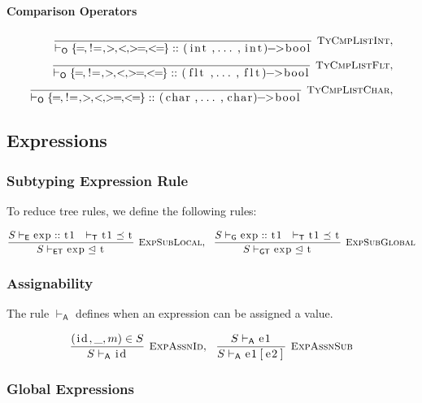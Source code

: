 \documentclass{article}
\newcommand{\code}[1]{\lstinline[columns=fixed]{#1}}
\newcommand{\drmrule}[5]{\frac{#1}{#2\vdash_{\mathsf{#3}}#4}\textsc{\ \small{#5}}}
\newcommand{\ruleapp}[1]{\vdash_{\mathsf{#1}}}
\newcommand{\mc}[1]{\textnormal{\code{#1}}}
\newcommand{\subsubsubsection}{\paragraph}
\begin{document}
				\subsubsubsection{Comparison Operators}
				
					\begin{align*}
						\drmrule{}{}{O}{\{\mc{=},\mc{!=},\mc{>},\mc{<},\mc{>=},\mc{<=}\} :: \mc{(int,...,int)->bool}}{TyCmpListInt},\\
						\drmrule{}{}{O}{\{\mc{=},\mc{!=},\mc{>},\mc{<},\mc{>=},\mc{<=}\} :: \mc{(flt,...,flt)->bool}}{TyCmpListFlt},\\
						\drmrule{}{}{O}{\{\mc{=},\mc{!=},\mc{>},\mc{<},\mc{>=},\mc{<=}\} :: \mc{(char,...,char)->bool}}{TyCmpListChar},\\
					\end{align*}
					
					
		\subsection{Expressions}
		
			\subsubsection{Subtyping Expression Rule}
			
				To reduce tree rules, we define the following rules:
				
				\begin{align*}
					\drmrule{S\ruleapp{E}\mc{exp}::\mc{t1}\ \ \ruleapp{T}\mc{t1}\preceq\mc{t}}{S}{ET}{\mc{exp} \trianglelefteq \mc{t}}{ExpSubLocal},\ \ 
					\drmrule{S\ruleapp{G}\mc{exp}::\mc{t1}\ \ \ruleapp{T}\mc{t1}\preceq\mc{t}}{S}{GT}{\mc{exp} \trianglelefteq \mc{t}}{ExpSubGlobal}
				\end{align*}
		
			\subsubsection{Assignability}
			
				The rule $\ruleapp{A}$ defines when an expression can be assigned a value.
				
				\begin{align*}
					\drmrule{(\mc{id},\_,m)\in S}{S}{A}{\mc{id}}{ExpAssnId},\ \ 
					\drmrule{S\ruleapp{A}\mc{e1}}{S}{A}{\mc{e1[e2]}}{ExpAssnSub}
				\end{align*}
				
			\subsubsection{Global Expressions}
			
\end{document}
